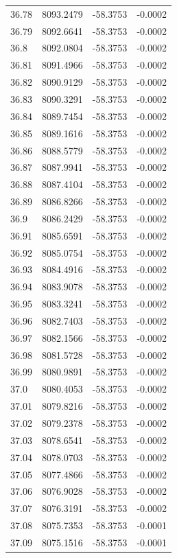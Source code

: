 \begin{table}[H]
\begin{tabular}{llll}
36.78 & 8093.2479 & -58.3753 & -0.0002 \\
36.79 & 8092.6641 & -58.3753 & -0.0002 \\
36.8 & 8092.0804 & -58.3753 & -0.0002 \\
36.81 & 8091.4966 & -58.3753 & -0.0002 \\
36.82 & 8090.9129 & -58.3753 & -0.0002 \\
36.83 & 8090.3291 & -58.3753 & -0.0002 \\
36.84 & 8089.7454 & -58.3753 & -0.0002 \\
36.85 & 8089.1616 & -58.3753 & -0.0002 \\
36.86 & 8088.5779 & -58.3753 & -0.0002 \\
36.87 & 8087.9941 & -58.3753 & -0.0002 \\
36.88 & 8087.4104 & -58.3753 & -0.0002 \\
36.89 & 8086.8266 & -58.3753 & -0.0002 \\
36.9 & 8086.2429 & -58.3753 & -0.0002 \\
36.91 & 8085.6591 & -58.3753 & -0.0002 \\
36.92 & 8085.0754 & -58.3753 & -0.0002 \\
36.93 & 8084.4916 & -58.3753 & -0.0002 \\
36.94 & 8083.9078 & -58.3753 & -0.0002 \\
36.95 & 8083.3241 & -58.3753 & -0.0002 \\
36.96 & 8082.7403 & -58.3753 & -0.0002 \\
36.97 & 8082.1566 & -58.3753 & -0.0002 \\
36.98 & 8081.5728 & -58.3753 & -0.0002 \\
36.99 & 8080.9891 & -58.3753 & -0.0002 \\
37.0 & 8080.4053 & -58.3753 & -0.0002 \\
37.01 & 8079.8216 & -58.3753 & -0.0002 \\
37.02 & 8079.2378 & -58.3753 & -0.0002 \\
37.03 & 8078.6541 & -58.3753 & -0.0002 \\
37.04 & 8078.0703 & -58.3753 & -0.0002 \\
37.05 & 8077.4866 & -58.3753 & -0.0002 \\
37.06 & 8076.9028 & -58.3753 & -0.0002 \\
37.07 & 8076.3191 & -58.3753 & -0.0002 \\
37.08 & 8075.7353 & -58.3753 & -0.0001 \\
37.09 & 8075.1516 & -58.3753 & -0.0001 \\

\end{tabular}
\end{table}
